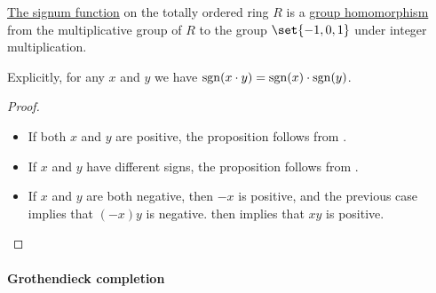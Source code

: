 \begin{proposition}\label{thm:def:totally_ordered_ring_signum}
  \hyperref[def:totally_ordered_ring_signum]{The signum function} on the totally ordered  ring \( R \) is a \hyperref[def:group/homomorphism]{group homomorphism} from the multiplicative group of \( R \) to the group \( \set{ -1, 0, 1 } \) under integer multiplication.

  Explicitly, for any \( x \) and \( y \) we have \( \operatorname{sgn}(x \cdot y) = \operatorname{sgn}(x) \cdot \operatorname{sgn}(y) \).
\end{proposition}
\begin{proof}
  \hfill
  \begin{itemize}
    \item If both \( x \) and \( y \) are positive, the proposition follows from .
    \item If \( x \) and \( y \) have different signs, the proposition follows from .
    \item If \( x \) and \( y \) are both negative, then \( -x \) is positive, and the previous case implies that \( (-x)y \) is negative.  then implies that \( xy \) is positive.
  \end{itemize}
\end{proof}

\paragraph{Grothendieck completion}

